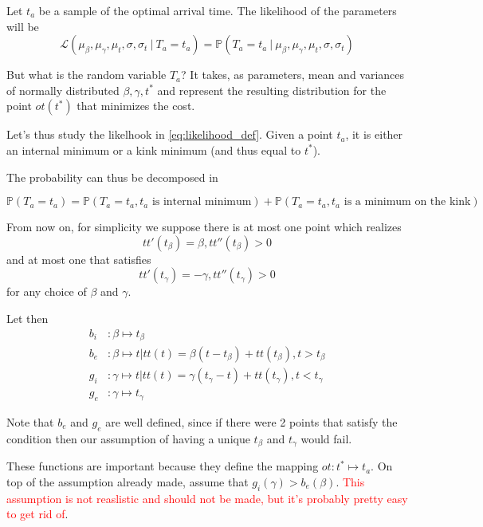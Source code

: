 \documentclass{article}
\begin{document}
Let \(t_a\) be a sample of the optimal arrival time. The likelihood of the parameters will be
\begin{equation}
  \label{eq:likelihood_def}
  \mathcal{L}(\mu_\beta, \mu_\gamma, \mu_t, \sigma, \sigma_t\ \vert\ T_a = t_a) =
  \mathbb{P}(T_a = t_a \ \vert\ \mu_\beta, \mu_\gamma, \mu_t, \sigma, \sigma_t)
\end{equation}

But what is the random variable \(T_a\)?
It takes, as parameters, mean and variances of normally distributed \(\beta, \gamma, t^*\) and represent the resulting distribution for the point \(ot(t^*)\) that minimizes the cost.

Let's thus study the likelhook in \eqref{eq:likelihood_def}.
Given a point \(t_a\), it is either an internal minimum or a kink minimum (and thus equal to \(t^*\)).

The probability can thus be decomposed in

\begin{equation}
  \label{eq:likelihood_split}
  \mathbb{P}(T_a = t_a) = \mathbb{P}(T_a = t_a, t_a \text{ is internal minimum}) +
  \mathbb{P}(T_a = t_a, t_a \text{ is a minimum on the kink})
\end{equation}

From now on, for simplicity we suppose there is at most one point which realizes
\[tt'(t_\beta) = \beta, tt''(t_\beta) > 0\]
and at most one that satisfies
\[tt'(t_\gamma) = -\gamma, tt''(t_\gamma) > 0\]
for any choice of \(\beta\) and \(\gamma\).

Let then
\begin{align*}
  b_i & : \beta \mapsto t_\beta \\
  b_e & : \beta \mapsto t | tt(t) = \beta (t - t_\beta) + tt(t_\beta), t > t_\beta\\
  g_i & : \gamma \mapsto t | tt(t) = \gamma (t_\gamma - t) + tt(t_\gamma), t < t_\gamma\\
  g_e & : \gamma \mapsto t_\gamma
\end{align*}

Note that \(b_e\) and \(g_e\) are well defined, since if there were 2 points that satisfy the condition then our assumption of having a unique \(t_\beta\) and \(t_\gamma\) would fail.

These functions are important because they define the mapping \(ot: t^* \mapsto t_a\).
On top of the assumption already made, assume that \(g_i(\gamma) > b_e(\beta)\). \textcolor{red}{This assumption is not reaslistic and should not be made, but it's probably pretty easy to get rid of}.
\end{document}
